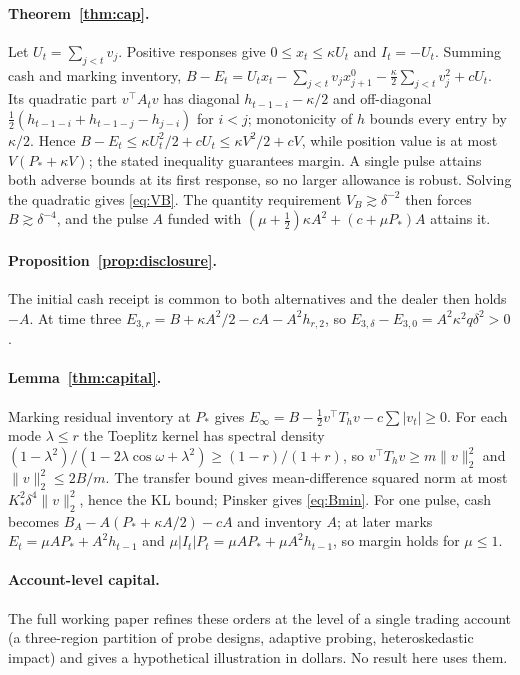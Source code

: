 \documentclass[12pt]{article}
\theoremstyle{definition}
\theoremstyle{remark}
\begin{document}
\paragraph{Theorem~\ref{thm:cap}.} Let $U_t=\sum_{j<t}v_j$. Positive responses give $0\le x_t\le\kappa U_t$ and $I_t=-U_t$. Summing cash and marking inventory, $B-E_t=U_tx_t-\sum_{j<t}v_jx^0_{j+1}-\tfrac\kappa2\sum_{j<t}v_j^2+cU_t$. Its quadratic part $v^\top A_tv$ has diagonal $h_{t-1-i}-\kappa/2$ and off-diagonal $\tfrac12(h_{t-1-i}+h_{t-1-j}-h_{j-i})$ for $i<j$; monotonicity of $h$ bounds every entry by $\kappa/2$. Hence $B-E_t\le\kappa U_t^2/2+cU_t\le\kappa V^2/2+cV$, while position value is at most $V(P_*+\kappa V)$; the stated inequality guarantees margin. A single pulse attains both adverse bounds at its first response, so no larger allowance is robust. Solving the quadratic gives \eqref{eq:VB}. The quantity requirement $V_B\gtrsim\delta^{-2}$ then forces $B\gtrsim\delta^{-4}$, and the pulse $A$ funded with $(\mu+\tfrac12)\kappa A^2+(c+\mu P_*)A$ attains it.


\paragraph{Proposition~\ref{prop:disclosure}.} The initial cash receipt is common to both alternatives and the dealer then holds $-A$. At time three $E_{3,r}=B+\kappa A^2/2-cA-A^2h_{r,2}$, so $E_{3,\delta}-E_{3,0}=A^2\kappa^2q\delta^2>0$.


\paragraph{Lemma~\ref{thm:capital}.} Marking residual inventory at $P_*$ gives $E_\infty=B-\tfrac12v^\top T_hv-c\sum|v_t|\ge0$. For each mode $\lambda\le r$ the Toeplitz kernel has spectral density $(1-\lambda^2)/(1-2\lambda\cos\omega+\lambda^2)\ge(1-r)/(1+r)$, so $v^\top T_hv\ge m\|v\|_2^2$ and $\|v\|_2^2\le2B/m$. The transfer bound gives mean-difference squared norm at most $K_*^2\delta^4\|v\|_2^2$, hence the KL bound; Pinsker gives \eqref{eq:Bmin}. For one pulse, cash becomes $B_A-A(P_*+\kappa A/2)-cA$ and inventory $A$; at later marks $E_t=\mu AP_*+A^2h_{t-1}$ and $\mu|I_t|P_t=\mu AP_*+\mu A^2h_{t-1}$, so margin holds for $\mu\le1$.


\paragraph{Account-level capital.} The full working paper refines these orders at the level of a single trading account (a three-region partition of probe designs, adaptive probing, heteroskedastic impact) and gives a hypothetical illustration in dollars. No result here uses them.
\end{document}
